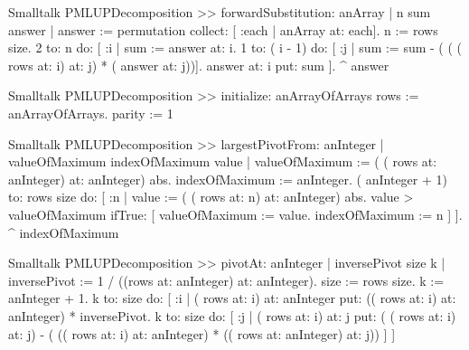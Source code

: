\begin{displaycode}{Smalltalk}
PMLUPDecomposition >> forwardSubstitution: anArray
    | n sum answer |
    answer := permutation collect: [ :each | anArray at: each].
    n := rows size.
    2 to: n do:
        [ :i |
          sum := answer at: i.
          1 to: ( i - 1) do: [ :j | sum := sum - ( ( ( rows at: i) 
                                           at: j) * ( answer at: j))].
          answer at: i put: sum ].
    ^ answer
\end{displaycode}

\begin{displaycode}{Smalltalk}
PMLUPDecomposition >> initialize: anArrayOfArrays
    rows := anArrayOfArrays.
    parity := 1
\end{displaycode}

\begin{displaycode}{Smalltalk}
PMLUPDecomposition >> largestPivotFrom: anInteger
    | valueOfMaximum indexOfMaximum value |
    valueOfMaximum := ( ( rows at: anInteger) at: anInteger) abs.
    indexOfMaximum := anInteger.
    ( anInteger + 1) to: rows size do:
        [ :n |
          value := ( ( rows at: n) at: anInteger) abs.
          value > valueOfMaximum
                ifTrue: [ valueOfMaximum := value.
                          indexOfMaximum := n ] ].
    ^ indexOfMaximum 
\end{displaycode}

\begin{displaycode}{Smalltalk}
PMLUPDecomposition >> pivotAt: anInteger
    | inversePivot size k |
    inversePivot := 1 / ((rows at: anInteger) at: anInteger).
    size := rows size.
    k := anInteger + 1.
    k to: size
        do: [ :i |
              ( rows at: i) at: anInteger put: (( rows at: i) at: 
                                            anInteger) * inversePivot.
              k to: size
                do: [ :j |
                      ( rows at: i) at: j put: ( ( rows at: i) at: j) 
   - ( (( rows at: i) at: anInteger) * (( rows at: anInteger) at: j)) ]
            ]
\end{displaycode}


